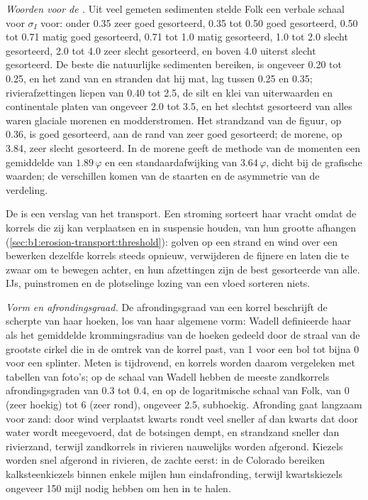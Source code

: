 \emph{Woorden voor de .} Uit veel gemeten sedimenten stelde Folk een verbale schaal voor $\sigma_I$ voor: onder \num{0.35} zeer goed gesorteerd, \num{0.35} tot \num{0.50} goed gesorteerd, \num{0.50} tot \num{0.71} matig goed gesorteerd, \num{0.71} tot \num{1.0} matig gesorteerd, \num{1.0} tot \num{2.0} slecht gesorteerd, \num{2.0} tot \num{4.0} zeer slecht gesorteerd, en boven \num{4.0} uiterst slecht gesorteerd. De beste  die natuurlijke sedimenten bereiken, is ongeveer \num{0.20} tot \num{0.25}, en het zand van  en stranden dat hij mat, lag tussen \num{0.25} en \num{0.35}; rivierafzettingen liepen van \num{0.40} tot \num{2.5}, de silt en klei van uiterwaarden en continentale platen van ongeveer \num{2.0} tot \num{3.5}, en het slechtst gesorteerd van alles waren glaciale morenen en modderstromen. Het strandzand van de figuur, op \num{0.36}, is goed gesorteerd, aan de rand van zeer goed gesorteerd; de morene, op \num{3.84}, zeer slecht gesorteerd. In de morene geeft de methode van de momenten een gemiddelde van $1.89\,\varphi$ en een standaardafwijking van $3.64\,\varphi$, dicht bij de grafische waarden; de verschillen komen van de staarten en de asymmetrie van de verdeling.

De  is een verslag van het transport. Een stroming sorteert haar vracht omdat de korrels die zij kan verplaatsen en in suspensie houden, van hun grootte afhangen (\cref{sec:b1:erosion-transport:threshold}): golven op een strand en wind over een  bewerken dezelfde korrels steeds opnieuw, verwijderen de fijnere en laten die te zwaar om te bewegen achter, en hun afzettingen zijn de best gesorteerde van alle. IJs, puinstromen en de plotselinge lozing van een vloed sorteren niets.

\emph{Vorm en afrondingsgraad.} De afrondingsgraad van een korrel beschrijft de scherpte van haar hoeken, los van haar algemene vorm: Wadell definieerde haar als het gemiddelde krommingsradius van de hoeken gedeeld door de straal van de grootste cirkel die in de omtrek van de korrel past, van 1 voor een bol tot bijna 0 voor een splinter. Meten is tijdrovend, en korrels worden daarom vergeleken met tabellen van foto's; op de schaal van Wadell hebben de meeste zandkorrels afrondingsgraden van \num{0.3} tot \num{0.4}, en op de logaritmische schaal van Folk, van 0 (zeer hoekig) tot 6 (zeer rond), ongeveer \num{2.5}, subhoekig. Afronding gaat langzaam voor zand: door wind verplaatst kwarts rondt veel sneller af dan kwarts dat door water wordt meegevoerd, dat de botsingen dempt, en strandzand sneller dan rivierzand, terwijl zandkorrels in rivieren nauwelijks worden afgerond. Kiezels worden snel afgerond in rivieren, de zachte eerst: in de Colorado bereiken kalksteenkiezels binnen enkele mijlen hun eindafronding, terwijl kwartskiezels ongeveer 150 mijl nodig hebben om hen in te halen.

